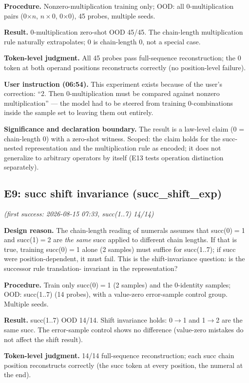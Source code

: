 \documentclass[sigplan,10pt,anonymous,review]{acmart}
\begin{document}
\textbf{Procedure.} Nonzero-multiplication training only; OOD: all
0-multiplication pairs (0$\times n$, $n\times$0, 0$\times$0), 45 probes,
multiple seeds.

\textbf{Result.} 0-multiplication zero-shot OOD 45/45. The chain-length
multiplication rule naturally extrapolates; 0 is chain-length 0, not a
special case.

\textbf{Token-level judgment.} All 45 probes pass full-sequence
reconstruction; the 0 token at both operand positions reconstructs
correctly (no position-level failure).

\textbf{User instruction (06:54).} This experiment exists because of the
user's correction: ``2. Then 0-multiplication must be compared against
nonzero multiplication'' --- the model had to be steered from training
0-combinations inside the sample set to leaving them out entirely.

\textbf{Significance and declaration boundary.} The result is a law-level
claim (0 = chain-length 0) with a zero-shot witness. Scoped: the claim
holds for the succ-nested representation and the multiplication rule as
encoded; it does not generalize to arbitrary operators by itself (E13
tests operation distinction separately).

\subsection{E9: succ shift invariance (succ\_shift\_exp)}\hfill\textit{(first success: 2026-08-15 07:33, succ(1..7) 14/14)}

\textbf{Design reason.} The chain-length reading of numerals assumes that
succ(0)$=$1 and succ(1)$=$2 are \emph{the same} succ applied to different
chain lengths. If that is true, training succ(0)$=$1 alone (2 samples)
must suffice for succ(1..7); if succ were position-dependent, it must fail.
This is the shift-invariance question: is the successor rule translation-
invariant in the representation?

\textbf{Procedure.} Train only succ(0)$=$1 (2 samples) and the 0-identity
samples; OOD: succ(1..7) (14 probes), with a value-zero error-sample control
group. Multiple seeds.

\textbf{Result.} succ(1..7) OOD 14/14. Shift invariance holds: 0$\to$1 and
1$\to$2 are the same succ. The error-sample control shows no difference
(value-zero mistakes do not affect the shift result).

\textbf{Token-level judgment.} 14/14 full-sequence reconstruction; each
succ chain position reconstructs correctly (the succ token at every
position, the numeral at the end).
\end{document}
